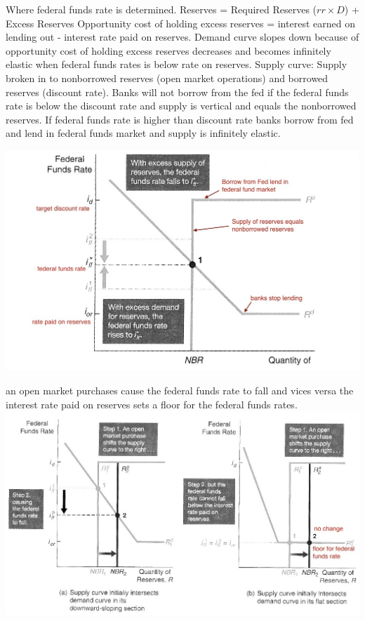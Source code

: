 \documentclass[12pt]{examnotes}
\begin{document}
\ra Where federal funds rate is determined.
\ra Reserves = Required Reserves ($rr \times D$) + Excess Reserves
\ra Opportunity cost of holding excess reserves = interest earned on lending out - interest rate paid on reserves.
\ra Demand curve slopes down because of opportunity cost of holding excess reserves decreases and becomes infinitely elastic when federal funds rates is below rate on reserves.
\ra Supply curve: 
\rna Supply broken in to nonborrowed reserves (open market operations) and borrowed reserves (discount rate). 
\rna Banks will not borrow from the fed if the federal funds rate is below the discount rate and supply is vertical and equals the nonborrowed reserves. 
\rna If federal funds rate is higher than discount rate banks borrow from fed and lend in federal funds market and supply is infinitely elastic.

\includegraphics[scale=0.4]{./imgs/161.jpg}

\vspace{6pt}
\ra an open market purchases cause the federal funds rate to fall and vices versa
\ra the interest rate paid on reserves sets a floor for the federal funds rates.
\includegraphics[scale=0.5]{./imgs/162.jpg}
\end{document}
